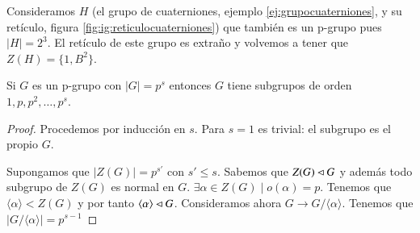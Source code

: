 \begin{ej}
	Consideramos $H$ (el grupo de cuaterniones, ejemplo \ref{ej:grupocuaterniones}, y su retículo, figura \ref{fig:ig:reticulocuaterniones}) que también es un p-grupo pues $|H| = 2^3$. El retículo de este grupo es extraño y volvemos a tener que $Z(H) = \{1, B^2\}$.
\end{ej}

\begin{ej}
	Si $G$ es un p-grupo con $|G| = p^s$ entonces $G$ tiene subgrupos de orden $1, p, p^2, \dots, p^s$.
\end{ej}

\begin{proof}
	Procedemos por inducción en $s$. Para $s = 1$ es trivial: el subgrupo es el propio $G$.
	
	Supongamos que $|Z(G)| = p^{s'}$ con $s' \leq s$. Sabemos que $Z(G) \lhd G$ y además todo subgrupo de $Z(G)$ es normal en $G$. $\exists \alpha \in Z(G) \mid o(\alpha) = p$. Tenemos que $\langle \alpha \rangle < Z(G)$ y por tanto $\langle \alpha \rangle \lhd G$. Consideramos ahora $G \to G/\langle \alpha \rangle$. Tenemos que $|G/\langle \alpha \rangle| = p^{s-1}$
\end{proof}

